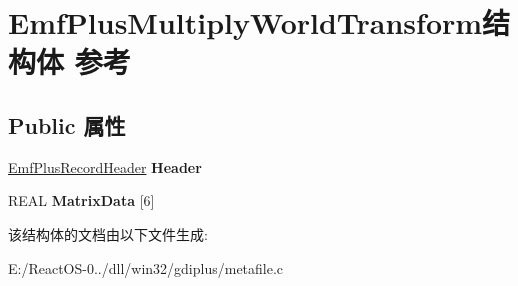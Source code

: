 \hypertarget{struct_emf_plus_multiply_world_transform}{}\section{Emf\+Plus\+Multiply\+World\+Transform结构体 参考}
\label{struct_emf_plus_multiply_world_transform}
\subsection*{Public 属性}
\begin{DoxyCompactItemize}
\item 
\mbox{\label{struct_emf_plus_multiply_world_transform_a2b5900346a1dac47ab5b95e9d283ef45}} 
\hyperlink{struct_emf_plus_record_header}{Emf\+Plus\+Record\+Header} {\bfseries Header}
\item 
\mbox{\label{struct_emf_plus_multiply_world_transform_ad0bd837918c17febc1eea6d7c68fdca3}} 
R\+E\+AL {\bfseries Matrix\+Data} \mbox{[}6\mbox{]}
\end{DoxyCompactItemize}


该结构体的文档由以下文件生成\+:\begin{DoxyCompactItemize}
\item 
E\+:/\+React\+O\+S-\/0../dll/win32/gdiplus/metafile.\+c\end{DoxyCompactItemize}

